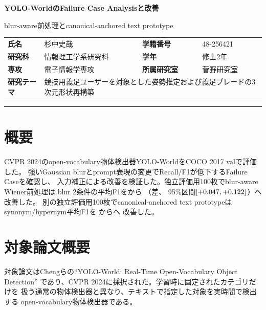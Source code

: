 \documentclass[lualatex,ja=standard,a4paper,10pt]{bxjsarticle}
\newcommand{\result}[1]{\textbf{\color{Accent}#1}}
\begin{document}
\begin{center}
  {\LARGE\sffamily\bfseries YOLO-WorldのFailure Case Analysisと改善\par}
  \vspace{0.35em}
  {\large\sffamily blur-aware前処理とcanonical-anchored text prototype\par}
\end{center}
\vspace{0.6em}

\noindent
\begin{tabularx}{\linewidth}{@{}>{\bfseries}lX>{\bfseries}lX@{}}
氏名 & 杉中史哉 & 学籍番号 & 48-256421 \\
研究科 & 情報理工学系研究科 & 学年 & 修士2年 \\
専攻 & 電子情報学専攻 & 所属研究室 & 菅野研究室 \\
研究テーマ & \multicolumn{3}{l}{競技用義足ユーザーを対象とした姿勢推定および義足ブレードの3次元形状再構築} \\
\end{tabularx}
\vspace{0.5em}
\hrule
\vspace{0.7em}

\section*{概要}

CVPR 2024のopen-vocabulary物体検出器YOLO-WorldをCOCO 2017 valで評価した。
強いGaussian blurとprompt表現の変更でRecall/F1が低下するFailure Caseを確認し、
入力補正による改善を検証した。独立評価用100枚でblur-aware Wiener前処理は
blur 2条件の平均F1を\SameModelBaselineBlurMeanFOne から
\SameModelImprovedBlurMeanFOne（差\result{\SameModelBlurMeanFOneDelta}、
95\%区間$[+0.047,+0.122]$）へ改善した。
別の独立評価用100枚でcanonical-anchored text prototypeはsynonym/hypernym平均F1を
\PromptPrototypeBaselineTargetMeanFOne から\PromptPrototypeImprovedTargetMeanFOne へ
改善した。

\section{対象論文概要}

対象論文はChengらの``YOLO-World: Real-Time Open-Vocabulary Object Detection''
\cite{yoloworld}であり、CVPR 2024に採択された。学習時に固定されたカテゴリだけを
扱う通常の物体検出器と異なり、テキストで指定した対象を実時間で検出する
open-vocabulary物体検出器である。
\end{document}

